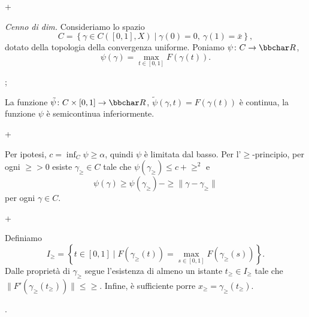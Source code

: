 \pg+

{\em Cenno di dim.} Consideriamo lo spazio
$$
C = \left\{ \gamma \in C([0,1],X) \mid \gamma(0)=0,\ \gamma(1)
= \bar{x} \right\},
$$
dotato della topologia della convergenza uniforme. Poniamo
$\psi \colon C \to \R$,
$$
\psi(\gamma) = \max_{t \in [0,1]} F(\gamma(t)).
$$

\pg;

La funzione $\tilde{\psi} \colon C \times [0,1] \to \R$,
$\tilde{\psi}(\gamma,t)=F(\gamma(t))$ \`e continua, la funzione
$\psi$ \`e semicontinua inferiormente.

\pg+

Per ipotesi, $c = \inf_C \psi \geq \alpha$, quindi $\psi$ \`e limitata
dal basso. Per l'$\ge$-principio, per ogni $\ge > 0$ esiste
$\gamma_\ge \in C$ tale che $\psi(\gamma_\ge) \leq c + \ge^2$ e
$$
\psi(\gamma) \geq \psi(\gamma_\ge) - \ge \|\gamma-\gamma_\ge\|
$$
per ogni $\gamma \in C$.

\pg+

Definiamo
$$
I_\ge = \left\{ t \in [0,1] \mid F(\gamma_\ge(t)) = \max_{s \in [0,1]}
F(\gamma_\ge(s)) \right\}.
$$
Dalle propriet\`a di $\gamma_\ge$ segue l'esistenza di almeno un
istante $t_\ge \in I_\ge$ tale che
$\|F'(\gamma_\ge(t_\ge))\| \leq \ge$. Infine, \`e sufficiente porre
$x_\ge = \gamma_\ge(t_\ge)$.
 










\pg. %
